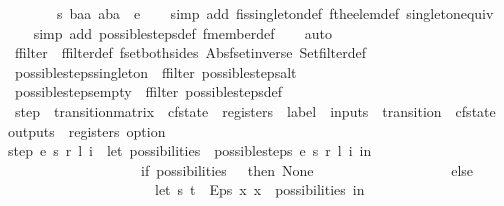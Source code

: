 \begin{isabellebody}
\ \ \ \ \ \ \ {\isacharparenleft}{\isacharparenleft}s{\isacharcomma}\ baa{\isacharparenright}{\isacharcomma}\ aba{\isacharparenright}\ {\isacharbar}{\isasymin}{\isacharbar}\ e{\isachardoublequoteclose}\isanewline
%
\isadelimproof
\ \ %
\endisadelimproof
%
\isatagproof
{}\isamarkupfalse%
\ {\isacharparenleft}simp\ add{\isacharcolon}\ fis{\isacharunderscore}singleton{\isacharunderscore}def\ fthe{\isacharunderscore}elem{\isacharunderscore}def\ singleton{\isacharunderscore}equiv{\isacharparenright}\isanewline
\ \ \isamarkupfalse%
\ {\isacharparenleft}simp\ add{\isacharcolon}\ possible{\isacharunderscore}steps{\isacharunderscore}def\ fmember{\isacharunderscore}def{\isacharparenright}\isanewline
\ \ \isamarkupfalse%
\ auto%
\endisatagproof
{\isafoldproof}%
%
\isadelimproof
\isanewline
%
\endisadelimproof
\isanewline
{}\isamarkupfalse%
\ ffilter\ {\isacharequal}\ ffilter{\isacharunderscore}def\ fset{\isacharunderscore}both{\isacharunderscore}sides\ Abs{\isacharunderscore}fset{\isacharunderscore}inverse\ Set{\isachardot}filter{\isacharunderscore}def\isanewline
{}\isamarkupfalse%
\ possible{\isacharunderscore}steps{\isacharunderscore}singleton\ {\isacharequal}\ ffilter\ possible{\isacharunderscore}steps{\isacharunderscore}alt\isanewline
{}\isamarkupfalse%
\ possible{\isacharunderscore}steps{\isacharunderscore}empty\ {\isacharequal}\ ffilter\ possible{\isacharunderscore}steps{\isacharunderscore}def\isanewline
\isanewline
{}\isamarkupfalse%
\ step\ {\isacharcolon}{\isacharcolon}\ {\isachardoublequoteopen}transition{\isacharunderscore}matrix\ {\isasymRightarrow}\ cfstate\ {\isasymRightarrow}\ registers\ {\isasymRightarrow}\ label\ {\isasymRightarrow}\ inputs\ {\isasymRightarrow}\ {\isacharparenleft}transition\ {\isasymtimes}\ cfstate\ {\isasymtimes}\ outputs\ {\isasymtimes}\ registers{\isacharparenright}\ option{\isachardoublequoteclose}\ \isanewline
{\isachardoublequoteopen}step\ e\ s\ r\ l\ i\ {\isacharequal}\ {\isacharparenleft}let\ possibilities\ {\isacharequal}\ possible{\isacharunderscore}steps\ e\ s\ r\ l\ i\ in\isanewline
\ \ \ \ \ \ \ \ \ \ \ \ \ \ \ \ \ \ \ if\ possibilities\ {\isacharequal}\ {\isacharbraceleft}{\isacharbar}{\isacharbar}{\isacharbraceright}\ then\ None\isanewline
\ \ \ \ \ \ \ \ \ \ \ \ \ \ \ \ \ \ \ else\isanewline
\ \ \ \ \ \ \ \ \ \ \ \ \ \ \ \ \ \ \ \ \ let\ {\isacharparenleft}s{\isacharprime}{\isacharcomma}\ t{\isacharparenright}\ {\isacharequal}\ Eps\ {\isacharparenleft}{\isasymlambda}x{\isachardot}\ x\ {\isacharbar}{\isasymin}{\isacharbar}\ possibilities{\isacharparenright}\ in\isanewline

\end{isabellebody}
